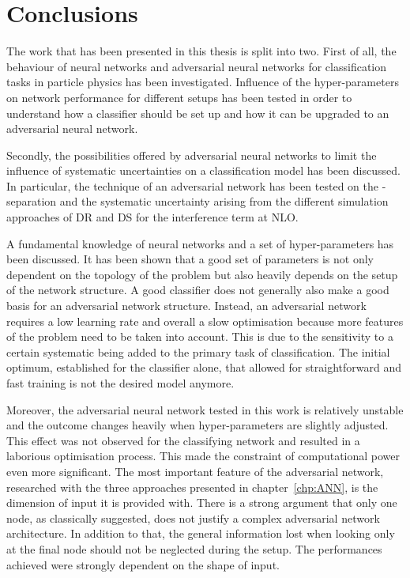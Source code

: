 \chapter{Conclusions}

The work that has been presented in this thesis is split into two. First of all, the behaviour of neural networks and adversarial neural networks for classification tasks in particle physics has been investigated. Influence of the hyper-parameters on network performance for different setups has been tested in order to understand how a classifier should be set up and how it can be upgraded to an adversarial neural network.

Secondly, the possibilities offered by adversarial neural networks to limit the influence of systematic uncertainties on a classification model has been discussed. In particular, the technique of an adversarial network has been tested on the \tW-\ttbar separation and the systematic uncertainty arising from the different simulation approaches of DR and DS for the interference term at NLO.

A fundamental knowledge of neural networks and a set of hyper-parameters has been discussed. It has been shown that a good set of parameters is not only dependent on the topology of the problem but also heavily depends on the setup of the network structure. A good classifier does not generally also make a good basis for an adversarial network structure. Instead, an adversarial network requires a low learning rate and overall a slow optimisation because more features of the problem need to be taken into account. This is due to the sensitivity to a certain systematic being added to the primary task of classification. The initial optimum, established for the classifier alone, that allowed for straightforward and fast training is not the desired model anymore.

Moreover, the adversarial neural network tested in this work is relatively unstable and the outcome changes heavily when hyper-parameters are slightly adjusted. This effect was not observed for the classifying network and resulted in a laborious optimisation process. This made the constraint of computational power even more significant.
The most important feature of the adversarial network, researched with the three approaches presented in chapter~\ref{chp:ANN}, is the dimension of input it is provided with. There is a strong argument that only one node, as classically suggested, does not justify a complex adversarial network architecture. In addition to that, the general information lost when looking only at the final node should not be neglected during the setup. The performances achieved were strongly dependent on the shape of input.

